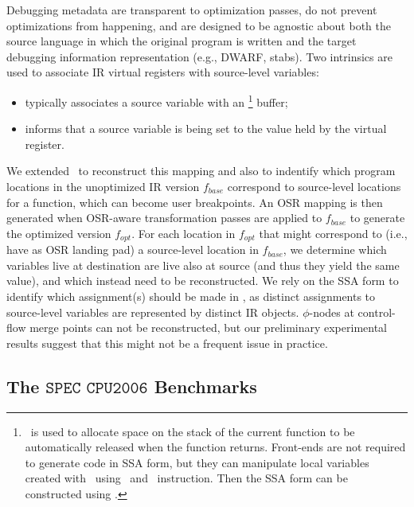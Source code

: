 Debugging metadata are transparent to optimization passes, do not prevent optimizations from happening, and are designed to be agnostic about both the source language in which the original program is written and the target debugging information representation (e.g., DWARF, stabs). Two intrinsics are used to associate IR virtual registers with source-level variables:
\begin{itemize}[itemsep=0pt,parsep=3pt]
 \item {} typically associates a source variable with an \alloca\footnote{\alloca\ is used to allocate space on the stack of the current function to be automatically released when the function returns. Front-ends are not required to generate code in SSA form, but they can manipulate local variables created with \alloca\ using \load\ and \store\ instruction. Then the SSA form can be constructed using \memtoreg.} buffer;
 \item {} informs that a source variable is being set to the value held by the virtual register.
\end{itemize}

\noindent We extended \tinyvm\ to reconstruct this mapping and also to indentify which program locations in the unoptimized IR version $f_{base}$ correspond to source-level locations for a function, which can become user breakpoints. An OSR mapping is then generated when OSR-aware transformation passes are applied to $f_{base}$ to generate the optimized version $f_{opt}$. For each location in $f_{opt}$ that might correspond to (i.e., have as OSR landing pad) a source-level location in $f_{base}$, we determine which variables live at destination are live also at source (and thus they yield the same value), and which instead need to be reconstructed. We rely on the SSA form to identify which assignment(s) should be made in \reconstruct, as distinct assignments to source-level variables are represented by distinct IR objects. $\phi$-nodes at control-flow merge points can not be reconstructed, but our preliminary experimental results suggest that this might not be a frequent issue in practice.


\subsection{The \texorpdfstring{$\texttt{SPEC CPU2006}$}{SPEC CPU2006} Benchmarks}

